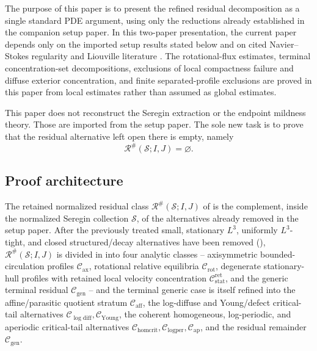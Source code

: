 \documentclass[11pt]{amsart}
\numberwithin{equation}{section}
\theoremstyle{plain}
\theoremstyle{definition}
\theoremstyle{remark}
\newcommand{\calS}{\mathcal S}
\newcommand{\calR}{\mathcal R}
\newcommand{\Cax}{\mathcal C_{\mathrm{ax}}}
\newcommand{\Crot}{\mathcal C_{\mathrm{rot}}}
\newcommand{\Cstat}{\mathcal C_{\mathrm{stat}}^{\mathrm{ret}}}
\newcommand{\Caff}{\mathcal C_{\mathrm{aff}}}
\newcommand{\Cgen}{\mathcal C_{\mathrm{gen}}}
\newcommand{\Chomcrit}{\mathcal C_{\mathrm{homcrit}}}
\newcommand{\Clogper}{\mathcal C_{\mathrm{logper}}}
\newcommand{\Capcrit}{\mathcal C_{\mathrm{ap}}}
\newcommand{\Cyoung}{\mathcal C_{\mathrm{Young}}}
\newcommand{\Clogdiff}{\mathcal C_{\log\mathrm{diff}}}
\begin{document}
The purpose of this paper is to present the refined residual decomposition as a
single standard PDE argument, using only the reductions already established in
the companion setup paper.  In this two-paper presentation, the current paper
depends only on the imported setup results stated below and on cited
Navier--Stokes regularity and Liouville literature
\cite{KNSS2009,Seregin2012}.  The
rotational-flux estimates, terminal concentration-set decompositions,
exclusions of local compactness failure and diffuse exterior concentration, and
finite separated-profile exclusions are proved in this paper from local
estimates rather than assumed as global estimates.

This paper does not reconstruct the Seregin extraction or the endpoint mildness
theory.  Those are imported from the setup paper.  The sole new task is to
prove that the residual alternative left open there is empty, namely
\[
   \calR^\#(\calS;I,J)=\varnothing .
\]

\subsection{Proof architecture}
\label{subsec:proof-architecture}
The retained normalized residual class \(\calR^\#(\calS;I,J)\) of
 is the complement, inside the normalized Seregin
collection \(\calS\), of the alternatives already removed in the setup paper.
After the previously treated small, stationary \(L^3\), uniformly
\(L^3\)-tight, and closed structured/decay alternatives have been removed
(), \(\calR^\#(\calS;I,J)\) is divided in
 into four analytic classes -- axisymmetric
bounded-circulation profiles \(\Cax\), rotational relative equilibria
\(\Crot\), degenerate stationary-hull profiles with retained local velocity
concentration \(\Cstat\), and the generic terminal residual \(\Cgen\) -- and
the terminal generic case is itself refined into the affine/parasitic quotient
stratum \(\Caff\), the log-diffuse and Young/defect critical-tail alternatives
\(\Clogdiff,\Cyoung\), the coherent homogeneous, log-periodic, and aperiodic
critical-tail alternatives \(\Chomcrit,\Clogper,\Capcrit\), and the residual
remainder \(\Cgen\).
\end{document}
